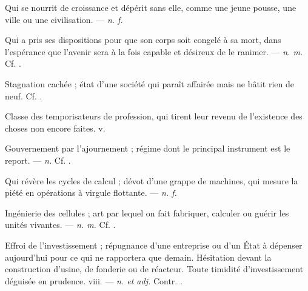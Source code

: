 Qui se nourrit de croissance et dépérit sans elle, comme une jeune pousse, une ville ou une civilisation. ---  \textit{n. f.}

 Qui a pris ses dispositions pour que son corps soit congelé à sa mort, dans l'espérance que l'avenir sera à la fois capable et désireux de le ranimer. ---  \textit{n. m.} Cf. .

 Stagnation cachée ; état d'une société qui paraît affairée mais ne bâtit rien de neuf. Cf. .

 Classe des temporisateurs de profession, qui tirent leur revenu de l'existence des choses non encore faites.   v.

 Gouvernement par l'ajournement ; régime dont le principal instrument est le report. ---  \textit{n.} Cf. .

 Qui révère les cycles de calcul ; dévot d'une grappe de machines, qui mesure la piété en opérations à virgule flottante. ---  \textit{n. f.}

 Ingénierie des cellules ; art par lequel on fait fabriquer, calculer ou guérir les unités vivantes.  ---  \textit{n. m.} Cf. .

 Effroi de l'investissement ; répugnance d'une entreprise ou d'un État à dépenser aujourd'hui pour ce qui ne rapportera que demain.   Hésitation devant la construction d'usine, de fonderie ou de réacteur.   Toute timidité d'investissement déguisée en prudence.   viii. ---  \textit{n. et adj.} Contr. .

